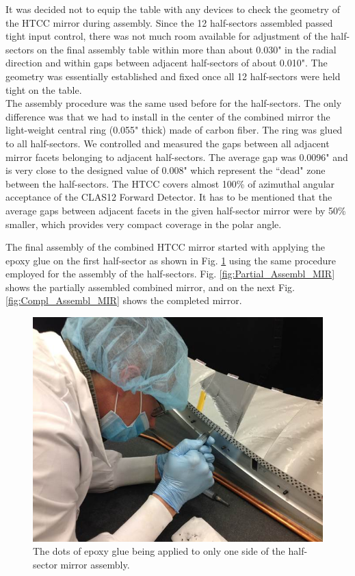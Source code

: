 \indent It was decided not to equip the table with any devices to check the geometry of the HTCC mirror during assembly. Since the 12 half-sectors assembled passed tight input control, there was not much room available for adjustment of the half-sectors on the final assembly table within more than about 0.030" in the radial direction and within gaps between adjacent half-sectors of about 0.010". The geometry was essentially established and fixed once all 12 half-sectors were held tight on the table.
\\
\indent The assembly procedure was the same used before for the half-sectors. The only difference was that we had to install in the center of the combined mirror the light-weight central ring (0.055" thick) made of carbon fiber. The ring was glued to all half-sectors. We controlled and measured the gaps between all adjacent mirror facets belonging to adjacent half-sectors. The average gap was 0.0096" and is very close to the designed value of 0.008" which represent the ``dead" zone between the half-sectors. The HTCC covers almost 100\% of azimuthal angular acceptance of the CLAS12 Forward Detector. It has to be mentioned that the average gaps between adjacent facets in the given half-sector mirror were by 50\% smaller, which provides very compact coverage in the polar angle. 

The final assembly of the combined HTCC mirror started with applying the epoxy glue on the first half-sector as shown in Fig. \ref{fig:Ap_Gl_Half_Sect} using the same procedure employed for the assembly of the half-sectors. Fig. \ref{fig:Partial_Assembl_MIR} shows the partially assembled combined mirror, and on the next Fig. \ref{fig:Compl_Assembl_MIR} shows the completed mirror. 
 
\begin{figure}[ht]
    \centering
    \includegraphics[width=1.0\linewidth]{images/Ap_Gl_Half_Sect.jpg}
    \caption{The dots of epoxy glue being applied to only one side of the half-sector mirror assembly.}
    \label{fig:Ap_Gl_Half_Sect}
\end{figure}
 
